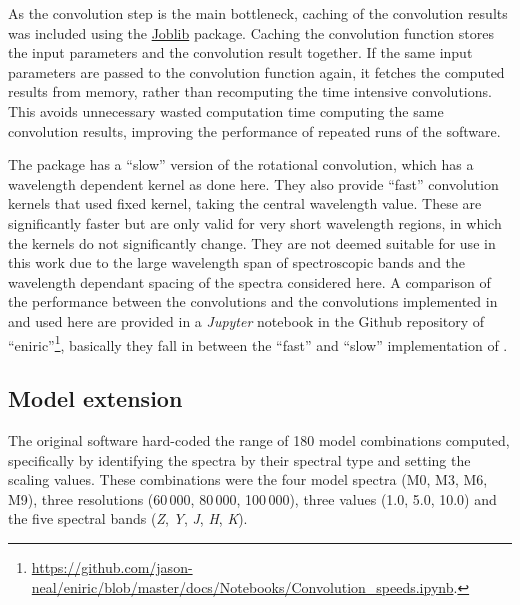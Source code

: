 As the convolution step is the main bottleneck, caching of the convolution results was included using the \href{https://joblib.readthedocs.io}{Joblib} package.
Caching the convolution function stores the input parameters and the convolution result together.
If the same input parameters are passed to the convolution function again, it fetches the computed results from memory, rather than recomputing the time intensive convolutions.
This avoids unnecessary wasted computation time computing the same convolution results, improving the performance of repeated runs of the software.

The \pyastronomy{} package has a ``slow'' version of the rotational convolution, which has a wavelength dependent kernel as done here.
They also provide ``fast'' convolution kernels that used fixed kernel, taking the central wavelength value.
These are significantly faster but are only valid for very short wavelength regions, in which the kernels do not significantly change.
They are not deemed suitable for use in this work due to the large wavelength span of spectroscopic bands and the wavelength dependant spacing of the spectra considered here.
A comparison of the performance between the \pyastronomy{} convolutions and the convolutions implemented in \eniric{} and used here are provided in a \emph{Jupyter} notebook in the Github repository of ``eniric''\footnote{\href{https://github.com/jason-neal/eniric/blob/master/docs/Notebooks/Convolution_speeds.ipynb}{https://github.com/jason-neal/eniric/blob/master/docs/Notebooks/Convolution\_speeds.ipynb}.}, basically they fall in between the ``fast'' and ``slow'' implementation of \pyastronomy{}.


\subsection{Model extension}
\label{subsec:eniric_model_extesion}
The original software hard-coded the range of 180 model combinations computed, specifically by identifying the spectra by their spectral type and setting the \snr{} scaling values.
These combinations were the four model spectra (M0, M3, M6, M9), three resolutions (60\,000, 80\,000, 100\,000), three \Vsini{} values (1.0, 5.0, 10.0\kmps{}) and the five spectral bands (\emph{Z}, \emph{Y}, \emph{J}, \emph{H}, \emph{K}).

